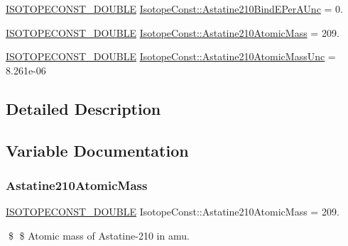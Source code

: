 \begin{DoxyCompactItemize}
\mbox{\hyperlink{group___isotope_const-_macros_ga8f45a7272ce02c0b4c65c44636ed719a}{I\+S\+O\+T\+O\+P\+E\+C\+O\+N\+S\+T\+\_\+\+D\+O\+U\+B\+LE}} \mbox{\hyperlink{group___isotope_const-_astatine-_at210_ga410b9b9d5949af7026432b7f56d1cb86}{Isotope\+Const\+::\+Astatine210\+Bind\+E\+Per\+A\+Unc}} = 0.
\item 
\mbox{\hyperlink{group___isotope_const-_macros_ga8f45a7272ce02c0b4c65c44636ed719a}{I\+S\+O\+T\+O\+P\+E\+C\+O\+N\+S\+T\+\_\+\+D\+O\+U\+B\+LE}} \mbox{\hyperlink{group___isotope_const-_astatine-_at210_ga48f3e238adf86656b6835db4a6e099a4}{Isotope\+Const\+::\+Astatine210\+Atomic\+Mass}} = 209.
\item 
\mbox{\hyperlink{group___isotope_const-_macros_ga8f45a7272ce02c0b4c65c44636ed719a}{I\+S\+O\+T\+O\+P\+E\+C\+O\+N\+S\+T\+\_\+\+D\+O\+U\+B\+LE}} \mbox{\hyperlink{group___isotope_const-_astatine-_at210_gaaa105aa8d0efd594c0d21e07007dac6d}{Isotope\+Const\+::\+Astatine210\+Atomic\+Mass\+Unc}} = 8.\+261e-\/06
\end{DoxyCompactItemize}


\subsection{Detailed Description}


\subsection{Variable Documentation}
\mbox{\label{group___isotope_const-_astatine-_at210_ga48f3e238adf86656b6835db4a6e099a4}} 
\subsubsection{\texorpdfstring{Astatine210\+Atomic\+Mass}{Astatine210AtomicMass}}
{\footnotesize\ttfamily \mbox{\hyperlink{group___isotope_const-_macros_ga8f45a7272ce02c0b4c65c44636ed719a}{I\+S\+O\+T\+O\+P\+E\+C\+O\+N\+S\+T\+\_\+\+D\+O\+U\+B\+LE}} Isotope\+Const\+::\+Astatine210\+Atomic\+Mass = 209.}

\$ \$ Atomic mass of Astatine-\/210 in amu. \mbox{\label{group___isotope_const-_astatine-_at210_gaaa105aa8d0efd594c0d21e07007dac6d}} 
